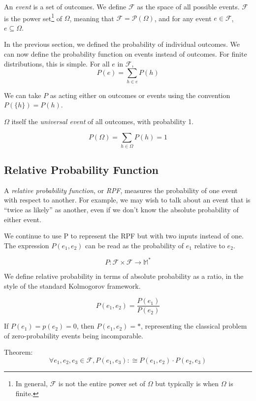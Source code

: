 \documentclass[twoside]{article}
\newcommand{\quotes}[1]{``#1''}
\begin{document}
An \textit{event} is a set of outcomes. We define \(\mathcal{F}\) as the space of all possible events. \(\mathcal{F}\) is the power set\footnote{In general, \(\mathcal{F}\) is not the entire power set of \(\Omega\) but typically is when \(\Omega\) is finite.} of \(\Omega\), meaning that \(\mathcal{F} = \mathcal{P}(\Omega)\), and for any event \(e \in \mathcal{F}\), \(e \subseteq \Omega\).

In the previous section, we defined the probability of individual outcomes. We can now define the probability function on events instead of outcomes. For finite distributions, this is simple. For all \(e\) in \(\mathcal{F}\),
\[ P(e) = \sum_{h \in e}{P(h)}\]

We can take \(P\) as acting either on outcomes or events using the convention \(P(\{h\}) = P(h)\).

\(\Omega\) itself the \textit{universal event} of all outcomes, with probability 1.

\[P(\Omega) = \sum_{h \in \Omega}{P(h)} = 1\]

\subsection{Relative Probability Function}
\label{section:standard_relative_prob}

A \textit{relative probability function}, or \textit{RPF}, measures the probability of one event with respect to another. For example, we may wish to talk about an event that is \quotes{twice as likely} as another, even if we don't know the absolute probability of either event.

We continue to use P to represent the RPF but with two inputs instead of one. The expression \(P(e_1, e_2)\) can be read as the probability of \(e_1\) relative to \(e_2\).

\[P: \mathcal{F} \times \mathcal{F} \rightarrow \mathbb{M}^*\]

We define relative probability in terms of absolute probability as a ratio, in the style of the standard Kolmogorov framework.

\begin{equation}
\label{eq:ratio_definition}
P(e_1, e_2) = \frac{P(e_1)}{P(e_2)}
\end{equation}

If \(P(e_1) = p(e_2) = 0\), then \(P(e_1, e_2) = \ast\), representing the classical problem of zero-probability events being incomparable.

Theorem: \[\forall e_1, e_2, e_3 \in \mathcal{F}, P(e_1, e_3) :\cong P(e_1, e_2) \cdot P(e_2, e_3)\]
\end{document}
